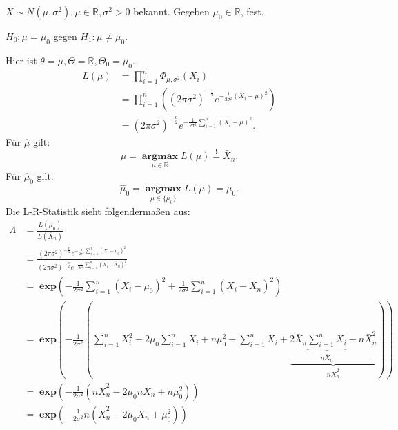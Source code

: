 \documentclass[10pt]{article}
\newcommand{\IR}{\mathbb{R}} %
\newcommand{\sni}{\sum_{i=1}^{n}} %
\newenvironment{BSP}[1][]
{\begin{Beispiel}[frametitle=#1]}{\end{Beispiel}}
\begin{document}
	\begin{BSP}[Beispiel 2.1.1 (z-Test mit zweiseitiger Alternative)]
		$X \sim N(\mu, \sigma^2), \mu \in \IR, \sigma^2 > 0$ bekannt. Gegeben $\mu_0 \in \IR$, fest.
		
		$H_0: \mu = \mu_0$ gegen $H_1: \mu \neq \mu_0$. 
		
		Hier ist $\theta = \mu, \Theta = \IR, \Theta_0 = {\mu_0}$.
		\begin{equation*}
			\begin{split}
				L(\mu) &= \prod_{i = 1}^{n} \Phi_{\mu, \sigma^2} (X_i)\\
				&= \prod_{i = 1}^{n} \left((2\pi \sigma^2)^{-\frac{1}{2}}e^{-\frac{1}{2 \sigma^2} (X_i - \mu)^2}\right)\\
				&= (2\pi \sigma^2)^{-\frac{n}{2}} e^{-\frac{1}{2\sigma^2} \sum_{i=1}^{n}(X_i -\mu)^2}.
			\end{split}
		\end{equation*}
		Für $\hat{\mu}$ gilt:
		\begin{equation*}
			\hat{\mu}= \;\underset{\mu \in \IR}{\textbf{argmax}} \; L(\mu) \overset{!}{=} \bar{X}_n.
		\end{equation*}
		Für $\hat{\mu}_0$ gilt:
		\begin{equation*}
			\hat{\mu}_0= \;\underset{\mu \in \{\mu_0\}}{\textbf{argmax}} \; L(\mu) = \mu_0.
		\end{equation*}
		Die L-R-Statistik sieht folgendermaßen aus:
		\begin{equation*}
		\begin{split}
			\Lambda &= \frac{L(\mu_0)}{L(\bar{X}_n)}\\
			&= \frac{(2 \pi \sigma^2)^{-\frac{n}{2}}e^{-\frac{1}{2 \sigma^2} \sum_{i=1}^{n}(X_i - \mu_0)^2}}{(2 \pi \sigma^2)^{-\frac{n}{2}}e^{-\frac{1}{2 \sigma^2} \sum_{i=1}^{n}(X_i - \bar{X}_n)^2}}\\
			&= \; \textbf{exp}\left(- \frac{1}{2\sigma^2}\sni (X_i - \mu_0)^2 + \frac{1}{2 \sigma^2} \sni (X_i - \bar{X}_n)^2\right)\\
			&= \; \textbf{exp} \left(- \frac{1}{2\sigma^2}(\sni X_i^2 - 2 \mu_0 \sni X_i + n\mu_0^2 - \sni X_i + \underbrace{2 \bar{X}_n \underbrace{\sni X_i}_{n \bar{X}_n} - n\bar{X}^2_n}_{n \bar{X}_n^2})\right)\\
			&= \; \textbf{exp} \left(- \frac{1}{2 \sigma^2} (n \bar{X}_n^2 - 2 \mu_0n\bar{X}_n + n\mu_0^2)\right)\\
			&= \; \textbf{exp} \left(- \frac{1}{2 \sigma^2}n (\bar{X}_n^2 - 2 \mu_0 \bar{X}_n + \mu_0^2)\right) \\

\end{split}
\end{equation*}
\end{BSP}
\end{document}
